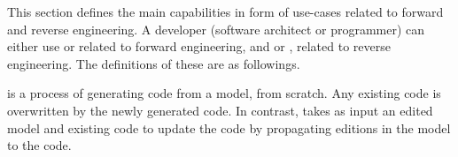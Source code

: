 


This section defines the main capabilities in form of use-cases related to forward and reverse engineering. 
A developer (software architect or programmer) can either use  or  related to forward engineering, and  or , related to reverse engineering. The definitions of these are as followings.

\begin{definition} \cite{Giese2006} is a process of generating code
	from a model, from scratch.
	Any existing code is overwritten by the newly generated code.
	In contrast,  takes as input an edited model and existing code to update the code by propagating
	editions in the model to the code.
\end{definition}


